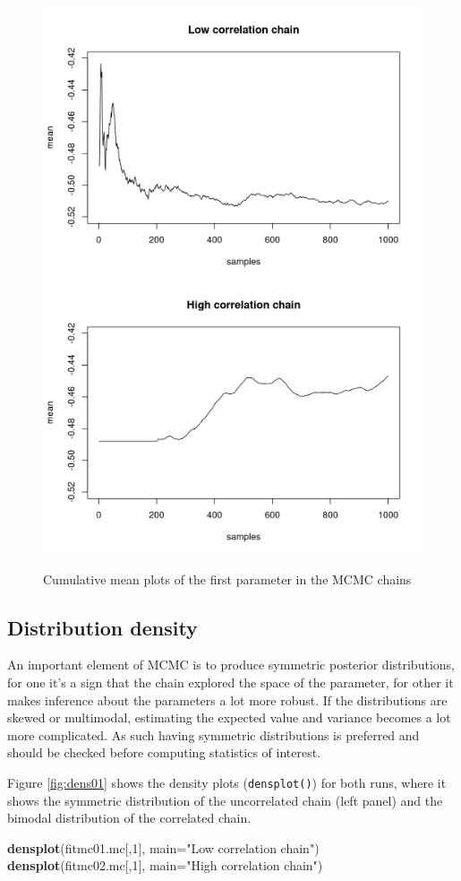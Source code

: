 \documentclass[
]{book}
\newenvironment{Shaded}{\begin{snugshade}}{\end{snugshade}}
\newcommand{\AttributeTok}[1]{\textcolor[rgb]{0.13,0.29,0.53}{#1}}
\newcommand{\DecValTok}[1]{\textcolor[rgb]{0.00,0.00,0.81}{#1}}
\newcommand{\FunctionTok}[1]{\textcolor[rgb]{0.13,0.29,0.53}{\textbf{#1}}}
\newcommand{\NormalTok}[1]{#1}
\newcommand{\StringTok}[1]{\textcolor[rgb]{0.31,0.60,0.02}{#1}}
\begin{document}
\begin{figure}
\includegraphics[width=0.5\linewidth]{_bookdown_files/_main_files/figure-html/cmean01-1} \includegraphics[width=0.5\linewidth]{_bookdown_files/_main_files/figure-html/cmean01-2} \caption{Cumulative mean plots of the first parameter in the MCMC chains}\label{fig:cmean01}
\end{figure}

\hypertarget{distribution-density}{%
\subsection{Distribution density}\label{distribution-density}}

An important element of MCMC is to produce symmetric posterior distributions, for one it's a sign that the chain explored the space of the parameter, for other it makes inference about the parameters a lot more robust. If the distributions are skewed or multimodal, estimating the expected value and variance becomes a lot more complicated. As such having symmetric distributions is preferred and should be checked before computing statistics of interest.

Figure \ref{fig:dens01} shows the density plots (\texttt{densplot()}) for both runs, where it shows the symmetric distribution of the uncorrelated chain (left panel) and the bimodal distribution of the correlated chain.

\begin{Shaded}
\begin{Highlighting}[]
\FunctionTok{densplot}\NormalTok{(fitmc01.mc[,}\DecValTok{1}\NormalTok{], }\AttributeTok{main=}\StringTok{"Low correlation chain"}\NormalTok{)}
\FunctionTok{densplot}\NormalTok{(fitmc02.mc[,}\DecValTok{1}\NormalTok{], }\AttributeTok{main=}\StringTok{"High correlation chain"}\NormalTok{)}
\end{Highlighting}
\end{Shaded}
\end{document}
